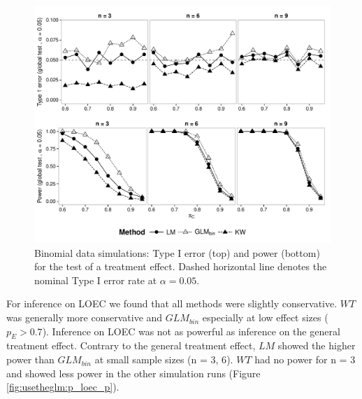 \begin{figure}
  \centering
  \includegraphics[width = \textwidth]{chapters/usetheglm/p_glob_p.pdf}
  \caption[Binomial data simulations: 
  Type I error (top) and  power (bottom) for the test of a treatment effect.]{
  Binomial data simulations: Type I error (top) and  power (bottom) for the test of a treatment effect. 
  Dashed horizontal line denotes the nominal Type I error rate at $\alpha = 0.05$.
  }
  \label{fig:usetheglm:p_glob_p}
\end{figure}

For inference on LOEC we found that all methods were slightly conservative.
$WT$ was generally more conservative and $GLM_{bin}$ especially at low effect sizes ($p_E > 0.7$).
Inference on LOEC was not as powerful as inference on the general treatment effect.
Contrary to the general treatment effect, $LM$ showed the higher power than $GLM_{bin}$ at small sample sizes (n = {3, 6}).
$WT$ had no power for n = 3 and showed less power in the other simulation runs (Figure \ref{fig:usetheglm:p_loec_p}).

